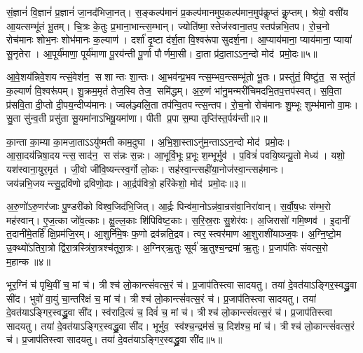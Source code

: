 \setcounter{anuvakam}{0}

   सं॒ज्ञानं॑ वि॒ज्ञानं॑ प्र॒ज्ञानं॑ जा॒नद॑भिजा॒नत्।
   स॒ङ्कल्प॑मानं प्र॒कल्प॑मानमुप॒\-कल्प॑मान॒मुप॑कॢप्तं कॢ॒प्तम्।
   श्रेयो॒ वसी॑य आ॒यत्सम्भू॑तं भू॒तम्।
   चि॒त्रः के॒तुः प्र॒भाना॒भान्त्स॒म्भान्।
   ज्योति॑ष्मा॒स्तेज॑स्वाना॒तप॒स्तप॑न्नभि॒\-तप\sn{}।
   रो॒च॒नो रोच॑मानः शोभ॒नः शोभ॑मानः क॒ल्याण॑।
   दर्\mbox{}शा॑ दृ॒ष्टा द॑र्\mbox{}श॒ता वि॒श्वरू॑पा सुदर्\mbox{}श॒ना।
   आ॒प्याय॑माना॒ प्याय॑माना॒ प्याया॑ सू॒नृतेरा।
   आ॒पूर्य॑माणा॒ पूर्य॑माणा पू॒रय॑न्ती पू॒र्णा पौर्णमा॒सी।
   दा॒ता प्र॑दा॒ताऽऽन॒न्दो मोद॑ प्रमो॒दः॥५॥

   आ॒वे॒शय॑न्निवे॒शयन्त्सं॒वेश॑न॒ सशान्तः शा॒न्तः।
   आ॒भव॑न्प्र॒\-भवन्त्\-स॒म्भव॒न्त्सम्भू॑तो भू॒तः।
   प्रस्तु॑तं॒ विष्टु॑त॒ सस्तु॑तं क॒ल्याणं॑ वि॒श्वरू॑पम्।
   शु॒क्रम॒मृतं॑ तेज॒स्वि तेज॒ समि॑द्धम्।
   अ॒रु॒णं भा॑नु॒मन्मरी॑चिमदभि॒तप॒त्तप॑स्वत्।
   स॒वि॒ता प्र॑सवि॒ता दी॒प्तो दी॒पय॒न्दीप्य॑मानः।
   ज्वल॑ञ्ज्वलि॒ता तप॑न्वि॒तपन्त्स॒न्तप\sn{}।
   रो॒च॒नो रोच॑मानः शु॒म्भूः शुम्भ॑मानो वा॒मः।
   सु॒ता सु॑न्व॒ती प्रसु॑ता सू॒यमा॑नाऽभिषू॒यमा॑णा।
   पीती प्र॒पा स॒म्पा तृप्ति॑स्त॒र्पय॑न्ती॥२॥

   का॒न्ता का॒म्या का॒मजा॒ताऽऽयु॑ष्मती काम॒दुघा।
   अ॒भि॒शा॒स्ताऽ\-नु॑म॒न्ताऽऽन॒न्दो मोद॑ प्रमो॒दः।
   आ॒सा॒दय॑न्निषा॒\-दयन्त्स॒साद॑न॒ सस॑न्नः स॒न्नः।
   आ॒भूर्वि॒भूः प्र॒भूः श॒म्भूर्भुव॑।
   प॒वित्रं॑ पवयि॒ष्यन्पू॒तो मेध्य॑।
   यशो॒ यश॑स्वाना॒युर॒मृत॑।
   जी॒वो जी॑वि॒ष्यन्त्स्व॒र्गो लो॒कः।
   सह॑स्वा॒न्त्सही॑या॒नोज॑स्वा॒न्त्सह॑मानः।
   जय॑न्नभि॒जयन्त्सु॒\-द्रवि॑णो द्रविणो॒दाः।
   आ॒र्द्रप॑वित्रो॒ हरि॑केशो॒ मोद॑ प्रमो॒दः॥३॥

   अ॒रु॒णो॑ऽरु॒णर॑जाः पु॒ण्डरी॑को विश्व॒जिद॑भि॒जित्।
   आ॒र्द्रः पिन्व॑मा॒नोऽन्न॑वा॒न्रस॑वा॒निरा॑वान्।
   स॒र्वौ॒ष॒धः स॑म्भ॒रो मह॑स्वान्।
   ए॒ज॒त्का जो॑व॒त्काः।
   क्षु॒ल्ल॒काः शि॑पिविष्ट॒काः।
   स॒रि॒स्र॒राः सु॒शेर॑वः।
   अ॒जिरासो॑ गमि॒ष्णव॑।
   इ॒दानीं त॒दानी॑मे॒तर्\-\mbox{हि॑} क्षि॒प्रम॑जि॒रम्।
   आ॒शुर्नि॑मे॒षः फ॒णो द्रव॑न्नति॒द्रव।
   त्वर॒स्त्वर॑माण आ॒शुराशी॑याञ्ज॒वः।
   अ॒ग्नि॒ष्टो॒म उ॒क्थ्यो॑ऽतिरा॒त्रो द्वि॑रा॒त्रस्त्रि॑रा॒त्रश्च॑तूरा॒त्रः।
   अ॒ग्निर्{‌}ऋ॒तुः सूर्य॑ ऋ॒तुश्च॒न्द्रमा॑ ऋ॒तुः।
   प्र॒जाप॑तिः संवत्स॒रो म॒हान्क॥४॥
   \anuvakamend
   
   भूर॒ग्निं च॑ पृथि॒वीं च॒ मां च॑।
   त्रीश्च॑ लो॒कान्त्सं॑वत्स॒रं च॑।
   प्र॒जाप॑तिस्त्वा सादयतु।
   तया॑ दे॒वत॑याऽङ्गिर॒स्वद्ध्रु॒वा सी॑द।
   भुवो॑ वा॒युं चा॒न्तरि॑क्षं च॒ मां च॑।
   त्रीश्च॑ लो॒कान्त्सं॑वत्स॒रं च॑।
   प्र॒जाप॑तिस्त्वा सादयतु।
   तया॑ दे॒वत॑याऽङ्गिर॒स्वद्ध्रु॒वा सी॑द।
   स्व॑रादि॒त्यं च॒ दिवं॑ च॒ मां च॑।
   त्रीश्च॑ लो॒कान्त्सं॑वत्स॒रं च॑।
   प्र॒जाप॑तिस्त्वा सादयतु।
   तया॑ दे॒वत॑याऽङ्गिर॒स्वद्ध्रु॒वा सी॑द।
   भूर्भुव॒ स्व॑श्च॒न्द्रम॑सं च॒ दिश॑श्च॒ मां च॑।
   त्रीश्च॑ लो॒कान्त्सं॑वत्स॒रं च॑।
   प्र॒जाप॑तिस्त्वा सादयतु।
   तया॑ दे॒वत॑याऽङ्गिर॒स्वद्ध्रु॒वा सी॑द॥५॥
   \anuvakamend
   
